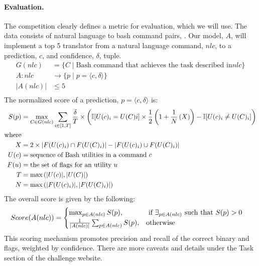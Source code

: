 \paragraph{Evaluation.}
The competition clearly defines a metric for evaluation, which we will use. The
data consists of natural language to bash command pairs, . Our model, $A$,
will implement a top 5 translator from a natural language command, $nlc$, to a
prediction, $c$, and confidence, $\delta$, tuple.
\[
	\begin{aligned}
		G(nlc)
		 & =\{C\mid \text{Bash command that achieves the task described in} nlc\} \\
		A : nlc
		 & \rightarrow \{p \mid p = \langle c, \delta\rangle\}                    \\
		|A(nlc)|
		 & \le 5                                                                  \\
	\end{aligned}
\]
The normalized score of a prediction, $p=\langle c, \delta\rangle$ is:
\[
	\begin{aligned}
		S(p)
		 & = \max_{C\in G(nlc)}\sum_{i\in[1,T]}\frac{\delta}{T}\times\left(
		\mathbb{I}[U(c)_i=U(C)i]\times\frac{1}{2}\left(
			1+\frac{1}{N}\left(X\right)\right) -\mathbb{I}[U(c)_i\ne U(C)_i]
		\right)                                                                    \\
		\text{where}
		 &                                                                         \\
		X
		 & = 2\times \abs{F(U(c)_i)\cap F(U(C)_i)} - \abs{F(U(c)_i)\cup F(U(C)_i)} \\
		U(c)
		 & = \text{sequence of Bash utilities in a command $c$}                    \\
		F(u)
		 & = \text{the set of flags for an utility $u$}                            \\
		T
		 & = \max\left(\abs{U(c)}, \abs{U(C)}\right)                               \\
		N
		 & = \max\left(\abs{F(U(c)_i)}, \abs{F(U(C)_i)}\right)                     \\
	\end{aligned}
\]
The overall score is given by the following:
\[
	\begin{aligned}
		Score(A(nlc))
		 & =
		\begin{cases}
			\max_{p\in A(nlc)}S(p),
			 & \text{ if }\exists_{p\in A(nlc)}\text{ such that }S(p) > 0 \\
			\frac{1}{\abs{A(nlc)}}\sum_{p\in A(nlc)}S(p),
			 & \text{otherwise}                                           \\
		\end{cases}
	\end{aligned}
\]
This scoring mechanism promotes precision and recall of the correct binary and
flags, weighted by confidence. There are more caveats and details under the
Task section of the challenge website.
